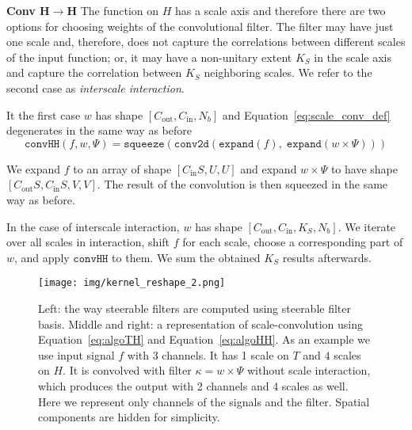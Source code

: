 \documentclass{article} \usepackage{multirow}
\def\Eqref#1{Equation~\ref{#1}}
\begin{document}
\textbf{Conv $\bm{H\rightarrow H}$}
The function on $H$ has a scale axis and therefore there are two options for choosing weights of the convolutional filter. The filter may have just one scale and, therefore, does not capture the correlations between different scales 
of the input function; or, it may have a non-unitary extent $K_S$ in the scale axis and capture the correlation 
between $K_S$ neighboring scales. We refer to the second case as \textit{interscale interaction}. 

It the first case $w$ has shape $[C_\text{out}, C_\text{in}, N_b]$ and \Eqref{eq:scale_conv_def}
degenerates in the same way as before
\begin{equation}
    \label{eq:algoHH}
    \texttt{convHH}(f, w, \Psi) = \texttt{squeeze}(
        \texttt{conv2d}(
        \texttt{expand}(f),\; 
        \texttt{expand}(w\times \Psi)
        )
    )
\end{equation}

We expand $f$ to an array of shape $[C_\text{in} S, U, U]$ and expand $w\times \Psi$
to have shape $[C_\text{out}S, C_\text{in}S, V, V]$. The result of the convolution is then squeezed in the same way as before.

In the case of interscale interaction, $w$ has shape $[C_\text{out}, C_\text{in}, K_S, N_b]$. We iterate over all scales in interaction, shift $f$ for each scale, choose a corresponding part of $w$, and apply $\texttt{convHH}$ to them. We sum the obtained $K_S$ results afterwards.




\begin{figure}[h]
    \begin{center}
        \texttt{[image: img/kernel\_reshape\_2.png]}
    \end{center}
    \caption{Left: the way steerable filters are computed using steerable filter basis. 
        Middle and right: a representation of scale-convolution using \Eqref{eq:algoTH} and \Eqref{eq:algoHH}.
        As an example we use input signal $f$ with 3 channels. It has 1 scale on $T$ and $4$ scales on $H$.
        It is convolved with filter $\kappa=w \times \Psi$ without scale interaction, which produces
        the output with 2 channels and 4 scales as well. Here we represent only 
        channels of the signals and the filter. Spatial components are hidden for simplicity.
    }
    \label{fig:kernel_reshape}
\end{figure}
\end{document}
